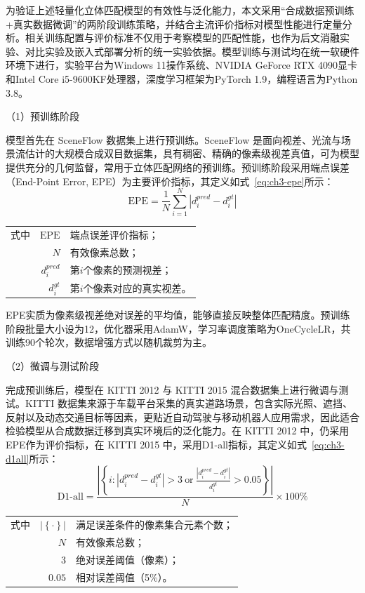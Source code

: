 为验证上述轻量化立体匹配模型的有效性与泛化能力，本文采用“合成数据预训练+真实数据微调”的两阶段训练策略，并结合主流评价指标对模型性能进行定量分析。相关训练配置与评价标准不仅用于考察模型的匹配性能，也作为后文消融实验、对比实验及嵌入式部署分析的统一实验依据。模型训练与测试均在统一软硬件环境下进行，实验平台为Windows 11操作系统、NVIDIA GeForce RTX 4090显卡和Intel Core i5-9600KF处理器，深度学习框架为PyTorch 1.9，编程语言为Python 3.8。

（1）预训练阶段

模型首先在 SceneFlow 数据集\cite{mayerLargeDatasetTrain2016}上进行预训练。SceneFlow 是面向视差、光流与场景流估计的大规模合成双目数据集，具有稠密、精确的像素级视差真值，可为模型提供充分的几何监督，常用于立体匹配网络的预训练。预训练阶段采用端点误差（End-Point Error, EPE）为主要评价指标，其定义如式~\eqref{eq:ch3-epe}所示：
\begin{equation}\label{eq:ch3-epe}
\mathrm{EPE}=\frac{1}{N}\sum_{i=1}^{N}\left|d_i^{pred}-d_i^{gt}\right|
\end{equation}
\begin{tabularx}{\textwidth}{@{}l@{\quad}r@{———}X@{}}
式中& $\mathrm{EPE}$ & 端点误差评价指标；\\
& $N$ & 有效像素总数；\\
& $d_i^{pred}$ & 第$i$个像素的预测视差；\\
& $d_i^{gt}$ & 第$i$个像素对应的真实视差。\\
\end{tabularx}\vspace{3.15bp}

EPE实质为像素级视差绝对误差的平均值，能够直接反映整体匹配精度。预训练阶段批量大小设为12，优化器采用AdamW，学习率调度策略为OneCycleLR，共训练90个轮次，数据增强方式以随机裁剪为主。

（2）微调与测试阶段

完成预训练后，模型在 KITTI 2012\cite{geigerAreWeReady2012a} 与 KITTI 2015\cite{menzeObjectSceneFlow2015a} 混合数据集上进行微调与测试。KITTI 数据集来源于车载平台采集的真实道路场景，包含实际光照、遮挡、反射以及动态交通目标等因素，更贴近自动驾驶与移动机器人应用需求，因此适合检验模型从合成数据迁移到真实环境后的泛化能力。在 KITTI 2012 中，仍采用EPE作为评价指标，在 KITTI 2015 中，采用D1-all指标，其定义如式~\eqref{eq:ch3-d1all}所示：
\begin{equation}\label{eq:ch3-d1all}
\mathrm{D1}\text{-all}=\frac{\left|\left\{i:\left|d_i^{pred}-d_i^{gt}\right|>3\ \text{or}\ \frac{\left|d_i^{pred}-d_i^{gt}\right|}{d_i^{gt}}>0.05\right\}\right|}{N}\times 100\%
\end{equation}
\begin{tabularx}{\textwidth}{@{}l@{\quad}r@{———}X@{}}
式中& $\left|\left\{\cdot\right\}\right|$ & 满足误差条件的像素集合元素个数；\\
& $N$ & 有效像素总数；\\
& $3$ & 绝对误差阈值（像素）；\\
& $0.05$ & 相对误差阈值（5\%）。\\
\end{tabularx}\vspace{3.15bp}

